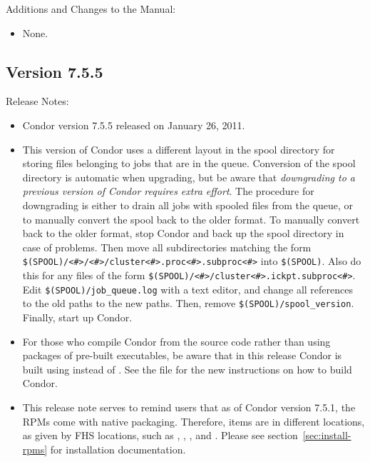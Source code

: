 \noindent Additions and Changes to the Manual:

\begin{itemize}

\item None.

\end{itemize}


\subsection*{\label{sec:New-7-5-5}Version 7.5.5}

\noindent Release Notes:

\begin{itemize}

\item Condor version 7.5.5 released on January 26, 2011.

\item This version of Condor uses a different layout in the spool
  directory for storing files belonging to jobs that are in the queue.
  Conversion of the spool directory is automatic when upgrading, but
  be aware that \emph{downgrading to a previous version of Condor
  requires extra effort}.  The procedure for downgrading is either
  to drain all jobs with spooled files from the queue, or to manually
  convert the spool back to the older format.  To manually convert
  back to the older format, stop Condor and back up the spool directory
  in case of problems.  Then move all subdirectories matching the form
  \verb|$(SPOOL)/<#>/<#>/cluster<#>.proc<#>.subproc<#>| into
  \verb|$(SPOOL)|.  Also do this for any files of the form
  \verb|$(SPOOL)/<#>/cluster<#>.ickpt.subproc<#>|.  Edit
  \verb|$(SPOOL)/job_queue.log| with a text editor, and change all
  references to the old paths to the new paths.  Then, remove
  \verb|$(SPOOL)/spool_version|.  Finally, start up Condor.

\item For those who compile Condor from the source code rather than
  using packages of pre-built executables, be aware that in this
  release Condor is built using  instead of .
  See the  file for the new instructions on how
  to build Condor.

\item This release note serves to remind users that as of Condor version 7.5.1,
  the RPMs come with native packaging.  
  Therefore, items are in different locations, as given by FHS locations,
  such as , , , and .  
  Please see section~\ref{sec:install-rpms} for installation documentation.


\end{itemize}
